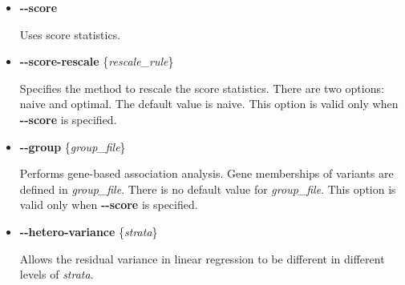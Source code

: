 \documentclass[12pt,letter]{article}
\begin{document}
\begin{itemize}
\item {\bf -{}-score}

Uses score statistics.

\item {\bf -{}-score-rescale} \{{\it rescale\_rule}\}

Specifies the method to rescale the score statistics. There are two options: {\ttfamily naive} and {\ttfamily optimal}.
The default value is {\ttfamily naive}. This option is valid only when {\bf -{}-score}
is specified.

\item {\bf -{}-group} \{{\it group\_file}\}

Performs gene-based association analysis. Gene memberships of variants are defined in {\it group\_file}.
There is no default value for {\it group\_file}. This option is valid only when {\bf -{}-score}
is specified.

\item {\bf -{}-hetero-variance} \{{\it strata}\}

Allows the residual variance in linear regression to be different in different levels of {\it strata}.
\end{itemize} 
\end{document}
